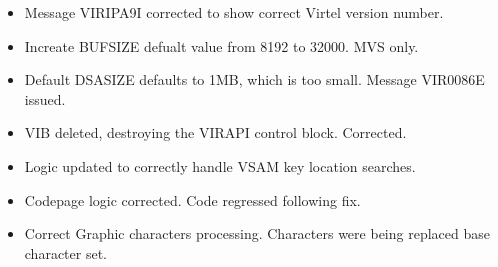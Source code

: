 \documentclass[letterpaper,10pt,english]{sphinxmanual}
\begin{document}
\sphinxAtStartPar
{}
\begin{itemize}
\item {} 
\sphinxAtStartPar
Message VIRIPA9I corrected to show correct Virtel version number.

\end{itemize}

\sphinxAtStartPar
{}
\begin{itemize}
\item {} 
\sphinxAtStartPar
Increate BUFSIZE defualt value from 8192 to 32000. MVS only.

\end{itemize}

\sphinxAtStartPar
{}
\begin{itemize}
\item {} 
\sphinxAtStartPar
Default DSASIZE defaults to 1MB, which is too small. Message VIR0086E issued.

\end{itemize}

\sphinxAtStartPar
{}
\begin{itemize}
\item {} 
\sphinxAtStartPar
VIB deleted, destroying the VIRAPI control block. Corrected.

\end{itemize}

\sphinxAtStartPar
{}
\begin{itemize}
\item {} 
\sphinxAtStartPar
Logic updated to correctly handle VSAM key location searches.

\end{itemize}

\sphinxAtStartPar
{}
\begin{itemize}
\item {} 
\sphinxAtStartPar
Codepage logic corrected. Code regressed following fix.

\end{itemize}

\sphinxAtStartPar
{}
\begin{itemize}
\item {} 
\sphinxAtStartPar
Correct Graphic characters processing. Characters were being replaced base character set.

\end{itemize}
\end{document}
